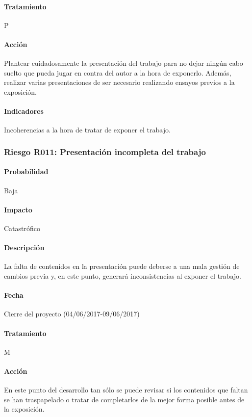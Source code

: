 \documentclass[10pt,a4paper]{article}
\begin{document}
				\paragraph{Tratamiento} P
				\paragraph{Acción} Plantear cuidadosamente la presentación del trabajo para no dejar ningún cabo suelto que pueda jugar en contra del autor a la hora de exponerlo. Además, realizar varias presentaciones de ser necesario realizando ensayos previos a la exposición.
				\paragraph{Indicadores} Incoherencias a la hora de tratar de exponer el trabajo.					

			\subsubsection{Riesgo R011: Presentación incompleta del trabajo}
				\paragraph{Probabilidad} Baja
				\paragraph{Impacto}	Catastrófico
				\paragraph{Descripción} La falta de contenidos en la presentación puede deberse a una mala gestión de cambios previa y, en este punto, generará inconsistencias al exponer el trabajo.
				\paragraph{Fecha} Cierre del proyecto (04/06/2017-09/06/2017)
				\paragraph{Tratamiento} M
				\paragraph{Acción} En este punto del desarrollo tan sólo se puede revisar si los contenidos que faltan se han traspapelado o tratar de completarlos de la mejor forma posible antes de la exposición.
\end{document}
